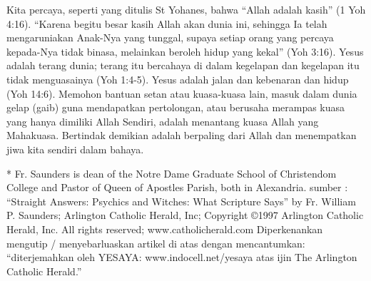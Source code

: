 Kita percaya, seperti yang ditulis St Yohanes, bahwa “Allah adalah kasih” (1 Yoh 4:16). “Karena begitu besar kasih Allah akan dunia ini, sehingga Ia telah mengaruniakan Anak-Nya yang tunggal, supaya setiap orang yang percaya kepada-Nya tidak binasa, melainkan beroleh hidup yang kekal” (Yoh 3:16). Yesus adalah terang dunia; terang itu bercahaya di dalam kegelapan dan kegelapan itu tidak menguasainya (Yoh 1:4-5). Yesus adalah jalan dan kebenaran dan hidup (Yoh 14:6). Memohon bantuan setan atau kuasa-kuasa lain, masuk dalam dunia gelap (gaib) guna mendapatkan pertolongan, atau berusaha merampas kuasa yang hanya dimiliki Allah Sendiri, adalah menantang kuasa Allah yang Mahakuasa. Bertindak demikian adalah berpaling dari Allah dan menempatkan jiwa kita sendiri dalam bahaya.


* Fr. Saunders is dean of the Notre Dame Graduate School of Christendom College and Pastor of Queen of Apostles Parish, both in Alexandria.
sumber : “Straight Answers: Psychics and Witches: What Scripture Says” by Fr. William P. Saunders; Arlington Catholic Herald, Inc; Copyright ©1997 Arlington Catholic Herald, Inc. All rights reserved; www.catholicherald.com
Diperkenankan mengutip / menyebarluaskan artikel di atas dengan mencantumkan: “diterjemahkan oleh YESAYA: www.indocell.net/yesaya atas ijin The Arlington Catholic Herald.”
	
	                                                                                                                                                                                                                                                                                                           